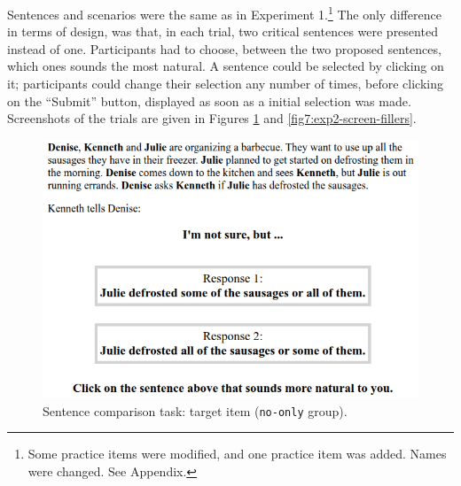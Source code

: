 Sentences and scenarios were the same as in Experiment 1.\footnote{Some practice items were modified, and one practice item was added. Names were changed. See Appendix.} The only difference in terms of design, was that, in each trial, two critical sentences were presented instead of one. Participants had to choose, between the two proposed sentences, which ones sounds the most natural. A sentence could be selected by clicking on it; participants could change their selection any number of times, before clicking on the ``Submit'' button, displayed as soon as a initial selection was made. Screenshots of the trials are given in Figures \ref{fig7:exp2-screen-target} and \ref{fig7:exp2-screen-fillers}.

\begin{figure}[H]
	\centering
	\includegraphics[width=.5\linewidth]{./exp2-screen-target.png}
	\caption[]{Sentence comparison task: target item (\texttt{no-only} group).}\label{fig7:exp2-screen-target}
\end{figure}

